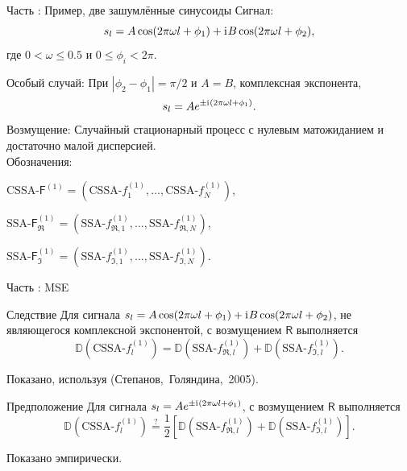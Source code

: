 \documentclass[10pt, ucs, notheorems, handout]{beamer}
\newcommand{\tX}[1]{\mathsf{#1}}
\newcommand{\iu}{\mathrm{i}\mkern1mu}
\newcommand{\RomanNumeralCaps}[1]
{\MakeUppercase{\romannumeral #1}}
\begin{document}
\begin{frame}{Часть \RomanNumeralCaps{2}: Пример, две зашумлённые синусоиды}
\alert{Сигнал:}
\begin{equation*}
\label{eq:general_ts}
s_l = A\cos(2 \pi\omega l + \phi_1) + \iu B\cos(2 \pi\omega l + \phi_2),
\end{equation*}
где $0<\omega\le 0.5$ и $0\le\phi_i < 2\pi$.

\alert{Особый случай:} При $|\phi_2-\phi_1| = \pi/2$ и $A=B$, комплексная экспонента,
$$s_l = Ae^{\pm \iu(2 \pi\omega l + \phi_1)}.$$
\alert{Возмущение:} Случайный стационарный процесс с нулевым матожиданием и достаточно малой дисперсией.\\
\vspace{1em}
\alert{Обозначения:}

$\text{CSSA-}\tX{F}^{(1)} = (\text{CSSA-}f^{(1)}_1, \ldots, \text{CSSA-}f^{(1)}_N)$,

$\text{SSA-}\tX{F}^{(1)}_{\Re} = (\text{SSA-}f^{(1)}_{\Re, 1}, \ldots, \text{SSA-}f^{(1)}_{\Re, N})$,

$\text{SSA-}\tX{F}^{(1)}_{\Im} = (\text{SSA-}f^{(1)}_{\Im, 1}, \ldots, \text{SSA-}f^{(1)}_{\Im, N})$.
\end{frame}

\begin{frame}{Часть \RomanNumeralCaps{2}: MSE}
\begin{block}{Следствие}
    Для сигнала $s_l = A\cos(2 \pi\omega l + \phi_1) + \iu B\cos(2 \pi\omega l + \phi_2)$, не являющегося комплексной экспонентой, с возмущением $\tX{R}$ выполняется
    $$\mathbb{D}(\text{CSSA-}f^{(1)}_l) = \mathbb{D}(\text{SSA-}f^{(1)}_{\Re, l}) + \mathbb{D}(\text{SSA-}f^{(1)}_{\Im, l}).$$
\end{block}

Показано, используя (Степанов,~Голяндина,~2005).

\begin{block}{Предположение}
    Для сигнала $s_l = Ae^{\pm \iu(2 \pi\omega l + \phi_1)}$, с возмущением $\tX{R}$ выполняется
    $$\mathbb{D}(\text{CSSA-}f^{(1)}_l) \stackrel{?}{=} \frac{1}{2}[\mathbb{D}(\text{SSA-}f^{(1)}_{\Re, l}) + \mathbb{D}(\text{SSA-}f^{(1)}_{\Im, l})].$$
\end{block}
Показано эмпирически.
\end{frame}
\end{document}
